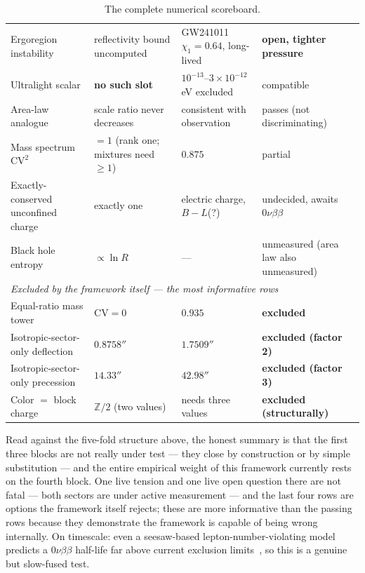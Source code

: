 \documentclass[aps,prd,twocolumn,superscriptaddress,nofootinbib]{revtex4-2}
\begin{document}
\begin{table}
\begin{tabular}{p{}p{}p{}p{}}
Ergoregion instability & reflectivity bound uncomputed & GW241011 $\chi_1=0.64$, long-lived & \textbf{open, tighter pressure} \\
Ultralight scalar & \textbf{no such slot} & $10^{-13}$--$3\times10^{-12}\,$eV excluded & compatible \\
Area-law analogue & scale ratio never decreases & consistent with observation & passes (not discriminating) \\
Mass spectrum $\mathrm{CV}^2$ & $=1$ (rank one; mixtures need $\geq1$) & $0.875$ & partial \\
Exactly-conserved unconfined charge & exactly one & electric charge, $B{-}L$(?) & undecided, awaits $0\nu\beta\beta$ \\
Black hole entropy & $\propto \ln R$ & --- & unmeasured (area law also unmeasured) \\
\midrule
\multicolumn{4}{l}{\emph{Excluded by the framework itself — the most informative rows}}\\
Equal-ratio mass tower & $\mathrm{CV}=0$ & $0.935$ & \textbf{excluded} \\
Isotropic-sector-only deflection & $0.8758''$ & $1.7509''$ & \textbf{excluded (factor 2)} \\
Isotropic-sector-only precession & $14.33''$ & $42.98''$ & \textbf{excluded (factor 3)} \\
Color $=$ block charge & $\mathbb{Z}/2$ (two values) & needs three values & \textbf{excluded (structurally)} \\
\bottomrule
\end{tabular}
\caption{The complete numerical scoreboard.}
\label{tab:scoreboard}
\end{table}
\FloatBarrier

Read against the five-fold structure above, the honest summary is that
the first three blocks are not really under test — they close by
construction or by simple substitution — and the entire empirical weight
of this framework currently rests on the fourth block. One live tension
and one live open question there are not fatal — both sectors
are under active measurement — and the last four rows are options the
framework itself rejects; these are more informative than the passing
rows because they demonstrate the framework is capable of being wrong
internally. On timescale: even a seesaw-based lepton-number-violating
model predicts a $0\nu\beta\beta$ half-life far above current exclusion
limits~\cite{KamLANDZen2023}, so this is a genuine but slow-fused test.
\end{document}
